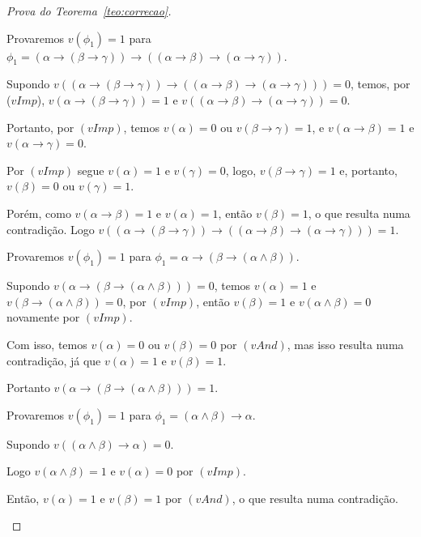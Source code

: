 \begin{proof}[Prova do Teorema~\ref{teo:correcao}]
\begin{provaporcasos}
\begin{provaporsubcasos}
                \subcasodeprova Provaremos $v(\phi_{1}) = 1$ para $\phi_{1} = (\alpha \to (\beta \to \gamma)) \to ((\alpha \to \beta) \to (\alpha \to \gamma ))$.
                
                    Supondo $v((\alpha \to (\beta \to \gamma)) \to ((\alpha \to \beta) \to (\alpha \to \gamma))) = 0$, temos, por ($vImp$), $v(\alpha \to (\beta \to \gamma)) = 1 \text{ e } v((\alpha \to \beta) \to (\alpha \to \gamma)) = 0$.

                    Portanto, por $(vImp)$, temos $v(\alpha) = 0$ ou $v(\beta \to \gamma) = 1$, e $v(\alpha \to \beta) = 1$ e $v(\alpha \to \gamma) = 0$. 
                    
                    Por $(vImp)$ segue $v(\alpha) = 1$ e $v(\gamma) = 0$, logo, $v(\beta \to \gamma) = 1$ e, portanto, $v(\beta) = 0$ ou $v(\gamma) = 1$. 
                    
                    Porém, como $v(\alpha \to \beta) = 1$ e $v(\alpha) = 1$, então $v(\beta) = 1$, o que resulta numa contradição. Logo $v((\alpha \to (\beta \to \gamma)) \to ((\alpha \to \beta) \to (\alpha \to \gamma))) = 1$.

                \subcasodeprova Provaremos $v(\phi_{1}) = 1$ para $\phi_{1} = \alpha \to (\beta \to (\alpha \land \beta))$. 

                    Supondo $v(\alpha \to (\beta \to (\alpha \land \beta))) = 0$, temos $v(\alpha) = 1$ e $v(\beta \to (\alpha \land \beta)) = 0$, por $(vImp)$, então $v(\beta) = 1$ e $v(\alpha \land \beta) = 0$ novamente por $(vImp)$. 
                    
                    Com isso, temos $v(\alpha) = 0$ ou $v(\beta) = 0$ por $(vAnd)$, mas isso resulta numa contradição, já que $v(\alpha) = 1$ e $v(\beta) = 1$. 
                    
                    Portanto $v(\alpha \to (\beta \to (\alpha \land \beta))) = 1$.

                \subcasodeprova Provaremos $v(\phi_{1}) = 1$ para $\phi_{1} = (\alpha \land \beta) \to \alpha$. 
                
                    Supondo $v((\alpha \land \beta) \to \alpha) = 0$. 
                
                    Logo $v(\alpha \land \beta) = 1$ e $v(\alpha) = 0$ por $(vImp)$. 
                    
                    Então, $v(\alpha) = 1$ e $v(\beta) = 1$ por $(vAnd)$, o que resulta numa contradição. 
                    

\end{provaporsubcasos}
\end{provaporcasos}
\end{proof}
